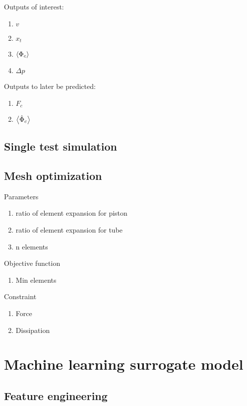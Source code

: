 \documentclass{article}
\begin{document}
Outputs of interest:
\begin{enumerate}
	\item $v$
	\item $x_{t}$
	\item $\left<\Phi_{c}\right>$
	\item $\Delta p$
\end{enumerate}

Outputs to later be predicted:
\begin{enumerate}
	\item $F_c$
	\item $\left<\dot{\Phi}_{c}\right>$
\end{enumerate}


\subsection{Single test simulation}

\subsection{Mesh optimization}

Parameters
\begin{enumerate}
	\item ratio of element expansion for piston
	\item ratio of element expansion for tube
	\item n elements
\end{enumerate}

Objective function
\begin{enumerate}
	\item Min elements
\end{enumerate}

Constraint
\begin{enumerate}
	\item Force
	\item Dissipation
\end{enumerate}

\section{Machine learning surrogate model}
\subsection{Feature engineering}
\end{document}
